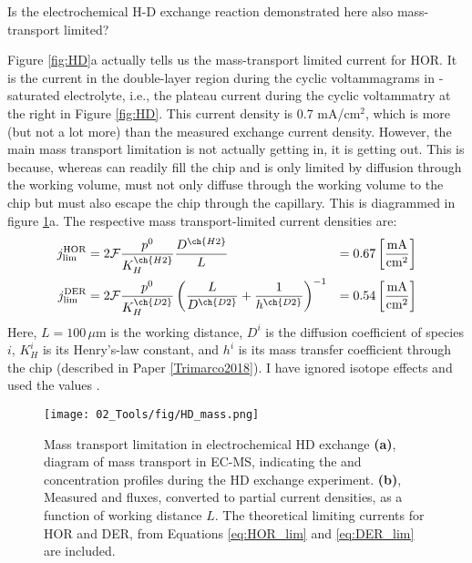 \begin{question}
	Is the electrochemical H-D exchange reaction demonstrated here also mass-transport limited?\label{q:HD}
\end{question}

Figure \ref{fig:HD}a actually tells us the mass-transport limited current for HOR. It is the current in the double-layer region during the cyclic voltammagrams in -saturated electrolyte, i.e., the plateau current during the cyclic voltammatry at the right in Figure \ref{fig:HD}. This current density is 0.7 mA/cm$^2$, which is more (but not a lot more) than the measured exchange current density. However, the main mass transport limitation is not actually getting  in, it is getting  out. This is because, whereas  can readily fill the chip and is only limited by diffusion through the working volume,  must not only diffuse through the working volume to the chip but must also escape the chip through the capillary. This is diagrammed in figure \ref{fig:HD_mass}a. The respective mass transport-limited current densities are:
\begin{align}
j_\text{lim}^\text{HOR} &= 2\mathcal{F} \frac{p^0}{K_H^{\ch{H2}}}\frac{D^{\ch{H2}}}{L} &= 0.67\left[\frac{\text{mA}}{\text{cm}^2}\right] \label{eq:HOR_lim}\\
j_\text{lim}^\text{DER} &= 2\mathcal{F} \frac{p^0}{K_H^{\ch{D2}}}\left(\frac{L}{D^{\ch{D2}}} + \frac{1}{h^{\ch{D2}}}\right)^{-1} &= 0.54\left[\frac{\text{mA}}{\text{cm}^2}\right] \label{eq:DER_lim}\\
\end{align}
Here, $L=100\,\mu$m is the working distance, $D^i$ is the diffusion coefficient of species $i$, $K_H^i$ is its Henry's-law constant, and $h^i$ is its mass transfer coefficient through the chip (described in Paper \ref{Trimarco2018}). I have ignored isotope effects and used the values .
\begin{figure}[h!]
	\centering
	\texttt{[image: 02\_Tools/fig/HD\_mass.png]}
	\caption{Mass transport limitation in electrochemical HD exchange \textbf{(a)}, diagram of mass transport in EC-MS, indicating the  and  concentration profiles during the HD exchange experiment. \textbf{(b)}, Measured  and  fluxes, converted to partial current densities, as a function of working distance $L$. The theoretical limiting currents for HOR and DER, from Equations \ref{eq:HOR_lim} and \ref{eq:DER_lim} are included.}
	\label{fig:HD_mass}
\end{figure}

